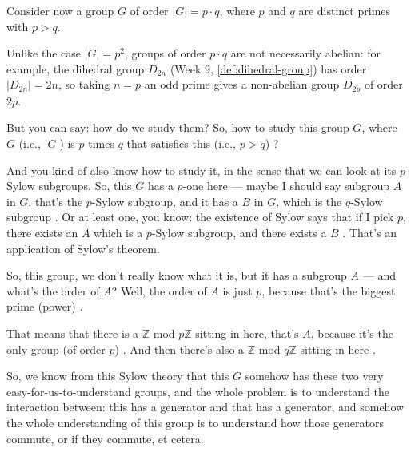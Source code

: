 \begin{content}
Consider now a group $G$ of order $|G| = p \cdot q$, where $p$ and $q$ are distinct primes with $p > q$.

Unlike the case $|G| = p^2$, groups of order $p \cdot q$ are not necessarily abelian: for example, the dihedral group $D_{2n}$ (Week 9, \cref{def:dihedral-group}) has order $|D_{2n}| = 2n$, so taking $n = p$ an odd prime gives a non-abelian group $D_{2p}$ of order $2p$.
\end{content}

\begin{speech}[00:29:36 - 00:31:07]
But you can say: how do we study them? So, how to study this group $G$, where $G$ (i.e., $|G|$) is $p$ times $q$ that satisfies this (i.e., $p > q$) ?

And you kind of also know how to study it, in the sense that we can look at its $p$-Sylow subgroups. So, this $G$ has a $p$-one here --- maybe I should say subgroup $A$ in $G$, that's the $p$-Sylow subgroup, and it has a $B$ in $G$, which is the $q$-Sylow subgroup . Or at least one, you know: the existence of Sylow says that if I pick $p$, there exists an $A$ which is a $p$-Sylow subgroup, and there exists a $B$ . That's an application of Sylow's theorem.

So, this group, we don't really know what it is, but it has a subgroup $A$ --- and what's the order of $A$? Well, the order of $A$ is just $p$, because that's the biggest prime (power) .

That means that there is a $\mathbb{Z}$ mod $p\mathbb{Z}$ sitting in here, that's $A$, because it's the only group (of order $p$) . And then there's also a $\mathbb{Z}$ mod $q\mathbb{Z}$ sitting in here .

So, we know from this Sylow theory that this $G$ somehow has these two very easy-for-us-to-understand groups, and the whole problem is to understand the interaction between: this has a generator and that has a generator, and somehow the whole understanding of this group is to understand how those generators commute, or if they commute, et cetera.
\end{speech}


